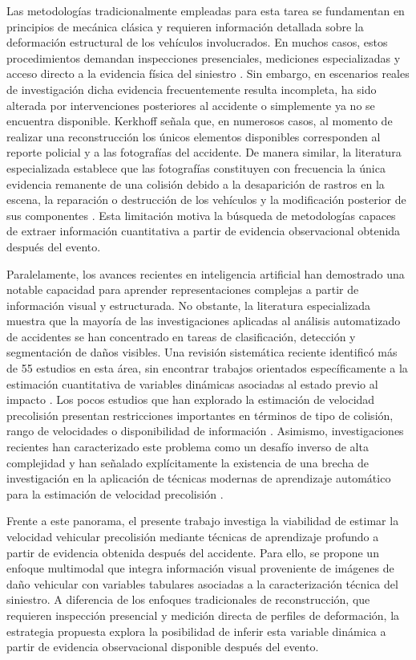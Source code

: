 \documentclass[esp]{SpeedEstimationAI_paper}
\begin{document}
Las metodologías tradicionalmente empleadas para esta tarea se fundamentan en principios de mecánica clásica y requieren información detallada sobre la deformación estructural de los vehículos involucrados. En muchos casos, estos procedimientos demandan inspecciones presenciales, mediciones especializadas y acceso directo a la evidencia física del siniestro \cite{Mrowicki2020,McHenry2001}. Sin embargo, en escenarios reales de investigación dicha evidencia frecuentemente resulta incompleta, ha sido alterada por intervenciones posteriores al accidente o simplemente ya no se encuentra disponible. Kerkhoff \cite{Kerkhoff1985} señala que, en numerosos casos, al momento de realizar una reconstrucción los únicos elementos disponibles corresponden al reporte policial y a las fotografías del accidente. De manera similar, la literatura especializada establece que las fotografías constituyen con frecuencia la única evidencia remanente de una colisión debido a la desaparición de rastros en la escena, la reparación o destrucción de los vehículos y la modificación posterior de sus componentes \cite{Linder2016}. Esta limitación motiva la búsqueda de metodologías capaces de extraer información cuantitativa a partir de evidencia observacional obtenida después del evento.

Paralelamente, los avances recientes en inteligencia artificial han demostrado una notable capacidad para aprender representaciones complejas a partir de información visual y estructurada. No obstante, la literatura especializada muestra que la mayoría de las investigaciones aplicadas al análisis automatizado de accidentes se han concentrado en tareas de clasificación, detección y segmentación de daños visibles. Una revisión sistemática reciente identificó más de 55 estudios en esta área, sin encontrar trabajos orientados específicamente a la estimación cuantitativa de variables dinámicas asociadas al estado previo al impacto \cite{Hasan2025}. Los pocos estudios que han explorado la estimación de velocidad precolisión presentan restricciones importantes en términos de tipo de colisión, rango de velocidades o disponibilidad de información \cite{Argote2022}. Asimismo, investigaciones recientes han caracterizado este problema como un desafío inverso de alta complejidad y han señalado explícitamente la existencia de una brecha de investigación en la aplicación de técnicas modernas de aprendizaje automático para la estimación de velocidad precolisión \cite{Zhao2021,Czajewski2026}.

Frente a este panorama, el presente trabajo investiga la viabilidad de estimar la velocidad vehicular precolisión mediante técnicas de aprendizaje profundo \cite{LeCun2015} a partir de evidencia obtenida después del accidente. Para ello, se propone un enfoque multimodal \cite{Baltrusaitis2019} que integra información visual proveniente de imágenes de daño vehicular con variables tabulares asociadas a la caracterización técnica del siniestro. A diferencia de los enfoques tradicionales de reconstrucción, que requieren inspección presencial y medición directa de perfiles de deformación, la estrategia propuesta explora la posibilidad de inferir esta variable dinámica a partir de evidencia observacional disponible después del evento.
\end{document}
